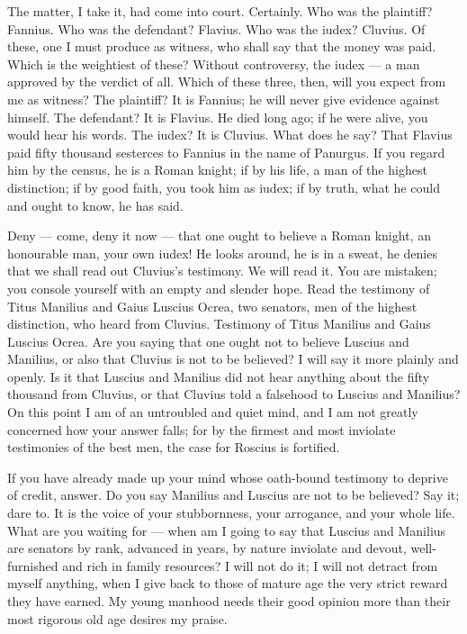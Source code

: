  The matter, I take it, had come into court. Certainly. Who was the plaintiff? Fannius. Who was the defendant? Flavius. Who was the iudex? Cluvius. Of these, one I must produce as witness, who shall say that the money was paid. Which is the weightiest of these? Without controversy, the iudex --- a man approved by the verdict of all. Which of these three, then, will you expect from me as witness? The plaintiff? It is Fannius; he will never give evidence against himself. The defendant? It is Flavius. He died long ago; if he were alive, you would hear his words. The iudex? It is Cluvius. What does he say? That Flavius paid fifty thousand sesterces to Fannius in the name of Panurgus. If you regard him by the census, he is a Roman knight; if by his life, a man of the highest distinction; if by good faith, you took him as iudex; if by truth, what he could and ought to know, he has said.

 Deny --- come, deny it now --- that one ought to believe a Roman knight, an honourable man, your own iudex! He looks around, he is in a sweat, he denies that we shall read out Cluvius's testimony. We will read it. You are mistaken; you console yourself with an empty and slender hope. Read the testimony of Titus Manilius and Gaius Luscius Ocrea, two senators, men of the highest distinction, who heard from Cluvius. Testimony of Titus Manilius and Gaius Luscius Ocrea. Are you saying that one ought not to believe Luscius and Manilius, or also that Cluvius is not to be believed? I will say it more plainly and openly. Is it that Luscius and Manilius did not hear anything about the fifty thousand from Cluvius, or that Cluvius told a falsehood to Luscius and Manilius? On this point I am of an untroubled and quiet mind, and I am not greatly concerned how your answer falls; for by the firmest and most inviolate testimonies of the best men, the case for Roscius is fortified.

 If you have already made up your mind whose oath-bound testimony to deprive of credit, answer. Do you say Manilius and Luscius are not to be believed? Say it; dare to. It is the voice of your stubbornness, your arrogance, and your whole life. What are you waiting for --- when am I going to say that Luscius and Manilius are senators by rank, advanced in years, by nature inviolate and devout, well-furnished and rich in family resources? I will not do it; I will not detract from myself anything, when I give back to those of mature age the very strict reward they have earned. My young manhood needs their good opinion more than their most rigorous old age desires my praise.

